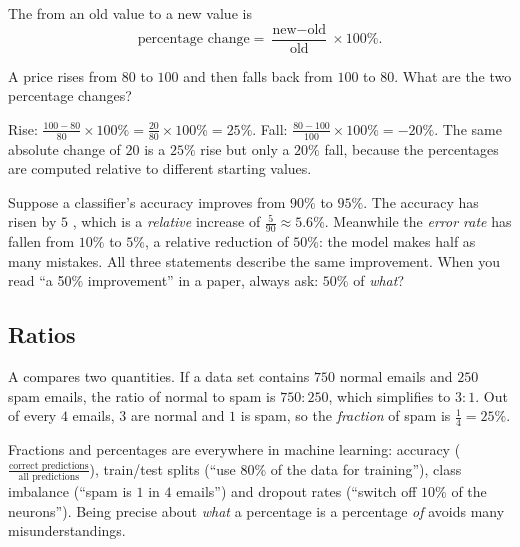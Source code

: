 The  from an old value to a new value is
\[
  \text{percentage change} = \frac{\text{new} - \text{old}}{\text{old}}
  \times 100\%.
\]

\begin{example}\label{ex:percent-change}
A price rises from $80$ to $100$ and then falls back from $100$ to $80$. What
are the two percentage changes?

\sol Rise: $\tfrac{100 - 80}{80} \times 100\% = \tfrac{20}{80}\times100\% =
25\%$. Fall: $\tfrac{80 - 100}{100}\times100\% = -20\%$. The same absolute
change of $20$ is a $25\%$ rise but only a $20\%$ fall, because the
percentages are computed relative to different starting values.
\end{example}

\begin{pitfall}
Suppose a classifier's accuracy improves from $90\%$ to $95\%$. The accuracy
has risen by $5$ , which is a
\emph{relative} increase of $\tfrac{5}{90} \approx 5.6\%$. Meanwhile the
\emph{error rate} has fallen from $10\%$ to $5\%$, a relative reduction of
$50\%$: the model makes half as many mistakes. All three statements describe
the same improvement. When you read ``a 50\% improvement'' in a paper, always
ask: $50\%$ of \emph{what}?
\end{pitfall}

\subsection{Ratios}

A  compares two quantities. If a data set contains $750$ normal
emails and $250$ spam emails, the ratio of normal to spam is $750 : 250$, which
simplifies to $3 : 1$. Out of every $4$ emails, $3$ are normal and $1$ is spam,
so the \emph{fraction} of spam is $\tfrac14 = 25\%$.

\begin{mlnote}
Fractions and percentages are everywhere in machine learning: accuracy
($\tfrac{\text{correct predictions}}{\text{all predictions}}$), train/test
splits (``use $80\%$ of the data for training''), class imbalance (``spam is
$1$ in $4$ emails'') and dropout rates (``switch off $10\%$ of the neurons'').
Being precise about \emph{what} a percentage is a percentage \emph{of} avoids
many misunderstandings.
\end{mlnote}

